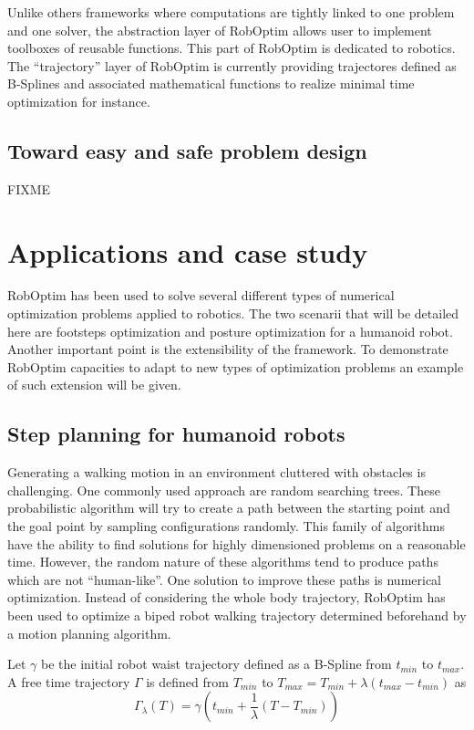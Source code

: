 \documentclass[conference,final,a4paper,twocolumn,9pt]{IEEEtran}
\begin{document}
Unlike others frameworks where computations are tightly linked to one
problem and one solver, the abstraction layer of RobOptim allows user
to implement toolboxes of reusable functions. This part of RobOptim is
dedicated to robotics. The ``trajectory'' layer of RobOptim is
currently providing trajectores defined as B-Splines and associated
mathematical functions to realize minimal time optimization for
instance.


\subsection{Toward easy and safe problem design}


FIXME

\section{Applications and case study}\label{sec:application}


RobOptim has been used to solve several different types of numerical
optimization problems applied to robotics. The two scenarii that will
be detailed here are footsteps optimization and posture optimization
for a humanoid robot. Another important point is the extensibility of
the framework. To demonstrate RobOptim capacities to adapt to new
types of optimization problems an example of such extension will be
given.
\subsection{Step planning for humanoid robots}


Generating a walking motion in an environment cluttered with obstacles
is challenging. One commonly used approach are random searching
trees. These probabilistic algorithm will try to create a path between
the starting point and the goal point by sampling configurations
randomly. This family of algorithms have the ability to find solutions
for highly dimensioned problems on a reasonable time. However, the
random nature of these algorithms tend to produce paths which are not
``human-like''. One solution to improve these paths is numerical
optimization. Instead of considering the whole body trajectory,
RobOptim has been used to optimize a biped robot walking trajectory
determined beforehand by a motion planning algorithm.

Let $\gamma$ be the initial robot waist trajectory defined as a
B-Spline from $t_{min}$ to $t_{max}$. A free time trajectory $\Gamma$
is defined from $T_{min}$ to \linebreak $T_{max} = T_{min} + \lambda
(t_{max} - t_{min})$ as
\begin{equation}
  \Gamma_{\lambda} (T) = \gamma (t_{min} + \frac{1}{\lambda} (T -
  T_{min}))
\end{equation}
\end{document}
